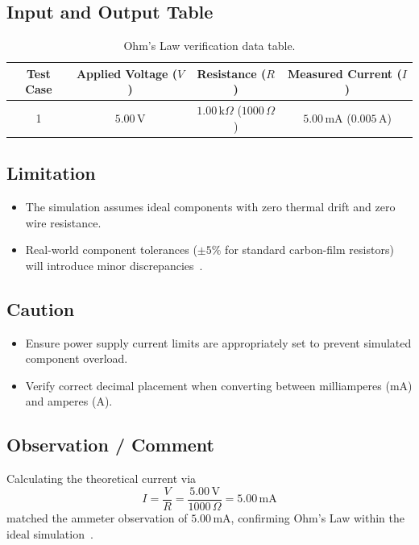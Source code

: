 \documentclass[11pt,a4paper]{article}
\begin{document}
\subsection{Input and Output Table}
\begin{table}[H]
    \centering
    \caption{Ohm's Law verification data table.}
    \label{tab:part3_io}
    \begin{tabularx}{\textwidth}{@{}C C C C@{}}
        \toprule
        \textbf{Test Case} & \textbf{Applied Voltage ($V$)} & \textbf{Resistance ($R$)} & \textbf{Measured Current ($I$)} \\
         & $5.00\,\text{V}$ & $1.00\,\text{k}\Omega$ ($1000\,\Omega$) & $5.00\,\text{mA}$ ($0.005\,\text{A}$) \\
        \bottomrule
    \end{tabularx}
\end{table}

\subsection{Limitation}
\begin{itemize}
    \item The simulation assumes ideal components with zero thermal drift and zero wire resistance.
    \item Real-world component tolerances ($\pm 5\%$ for standard carbon-film resistors) will introduce minor discrepancies~\cite{ref_floyd}.
\end{itemize}

\subsection{Caution}
\begin{itemize}
    \item Ensure power supply current limits are appropriately set to prevent simulated component overload.
    \item Verify correct decimal placement when converting between milliamperes (mA) and amperes (A).
\end{itemize}

\subsection{Observation / Comment}
Calculating the theoretical current via
\[
I = \frac{V}{R} = \frac{5.00\,\text{V}}{1000\,\Omega} = 5.00\,\text{mA}
\]
matched the ammeter observation of $5.00\,\text{mA}$, confirming Ohm's Law within the ideal simulation~\cite{ref_boylestad}.
\end{document}
